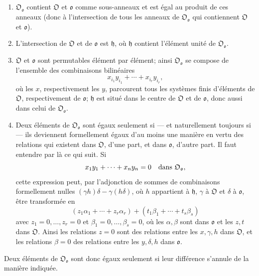 \begin{enumerate}
\item[(1)] \(\mathfrak O_{\mathfrak o}\) contient \(\mathfrak O\) et \(\mathfrak o\) comme sous-anneaux et est égal au produit de ces anneaux (donc à l'intersection de tous les anneaux de \(\mathfrak O_{\mathfrak o}\) qui contiennent \(\mathfrak O\) et \(\mathfrak o\)).

\item[(2)] L'intersection de \(\mathfrak O\) et de \(\mathfrak o\) est \(\mathfrak h\), où \(\mathfrak h\) contient l'élément unité de \(\mathfrak O_{\mathfrak o}\).

\item[(3)] \(\mathfrak O\) et \(\mathfrak o\) sont permutables élément par élément; ainsi \(\mathfrak O_{\mathfrak o}\) se compose de l'ensemble des combinaisons bilinéaires
\[
x_{i_1}y_{i_1}+\cdots+x_{i_r}y_{i_r},
\]
où les \(x\), respectivement les \(y\), parcourent tous les systèmes finis d'éléments de \(\mathfrak O\), respectivement de \(\mathfrak o\); \(\mathfrak h\) est situé dans le centre de \(\mathfrak O\) et de \(\mathfrak o\), donc aussi dans celui de \(\mathfrak O_{\mathfrak o}\).

\item[(4)] Deux éléments de \(\mathfrak O_{\mathfrak o}\) sont égaux seulement si --- et naturellement toujours si --- ils deviennent formellement égaux d'au moins une manière en vertu des relations qui existent dans \(\mathfrak O\), d'une part, et dans \(\mathfrak o\), d'autre part. Il faut entendre par là ce qui suit. Si
\[
x_1y_1+\cdots+x_ny_n=0
\quad\hbox{dans }\mathfrak O_{\mathfrak o},
\]
cette expression peut, par l'adjonction de sommes de combinaisons formellement nulles \((\gamma h)\delta-\gamma(h\delta)\), où \(h\) appartient à \(\mathfrak h\), \(\gamma\) à \(\mathfrak O\) et \(\delta\) à \(\mathfrak o\), être transformée en
\[
(z_1\alpha_1+\cdots+z_r\alpha_r)+(t_1\beta_1+\cdots+t_s\beta_s)
\]
avec \(z_1=0,\ldots,z_r=0\) et \(\beta_1=0,\ldots,\beta_s=0\), où les \(\alpha,\beta\) sont dans \(\mathfrak o\) et les \(z,t\) dans \(\mathfrak O\). Ainsi les relations \(z=0\) sont des relations entre les \(x,\gamma,h\) dans \(\mathfrak O\), et les relations \(\beta=0\) des relations entre les \(y,\delta,h\) dans \(\mathfrak o\).
\end{enumerate}

Deux éléments de \(\mathfrak O_{\mathfrak o}\) sont donc égaux seulement si leur différence s'annule de la manière indiquée.


